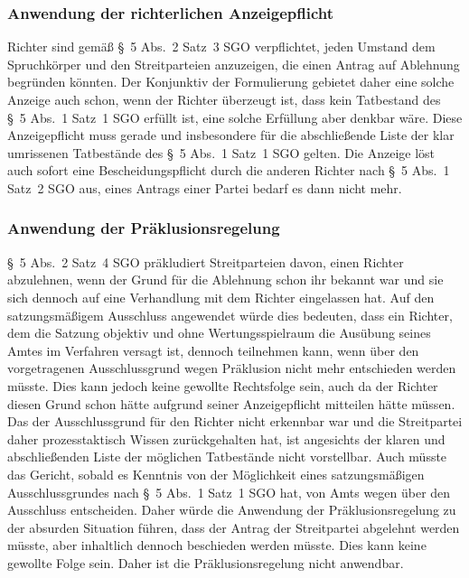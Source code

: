 \subsubsection{Anwendung der richterlichen Anzeigepflicht}
\label{Zusammensetzung:Spruchkoerper:Befangenheitsvermutung:Anzeigepflicht}
Richter sind gemäß \S~5 Abs.~2 Satz~3 SGO verpflichtet, jeden Umstand dem Spruchkörper und den Streitparteien anzuzeigen, die einen Antrag auf Ablehnung begründen könnten.
Der Konjunktiv der Formulierung gebietet daher eine solche Anzeige auch schon, wenn der Richter überzeugt ist, dass kein Tatbestand des \S~5 Abs.~1 Satz~1 SGO erfüllt ist, eine solche Erfüllung aber denkbar wäre.
Diese Anzeigepflicht muss gerade und insbesondere für die abschließende Liste der klar umrissenen Tatbestände des \S~5 Abs.~1 Satz~1 SGO gelten.
Die Anzeige löst auch sofort eine Bescheidungspflicht durch die anderen Richter nach \S~5 Abs.~1 Satz~2 SGO aus, eines Antrags einer Partei bedarf es dann nicht mehr.

\subsubsection{Anwendung der Präklusionsregelung}
\label{Zusammensetzung:Spruchkoerper:Befangenheitsvermutung:Praeklusion}
\S~5 Abs.~2 Satz~4 SGO präkludiert Streitparteien davon, einen Richter abzulehnen, wenn der Grund für die Ablehnung schon ihr bekannt war und sie sich dennoch auf eine Verhandlung mit dem Richter eingelassen hat.
Auf den satzungsmäßigem Ausschluss angewendet würde dies bedeuten, dass ein Richter, dem die Satzung objektiv und ohne Wertungsspielraum die Ausübung seines Amtes im Verfahren versagt ist, dennoch teilnehmen kann, wenn über den vorgetragenen Ausschlussgrund wegen Präklusion nicht mehr entschieden werden müsste.
Dies kann jedoch keine gewollte Rechtsfolge sein, auch da der Richter diesen Grund schon hätte aufgrund seiner Anzeigepflicht mitteilen hätte müssen.
Das der Ausschlussgrund für den Richter nicht erkennbar war und die Streitpartei daher prozesstaktisch Wissen zurückgehalten hat, ist angesichts der klaren und abschließenden Liste der möglichen Tatbestände nicht vorstellbar.
Auch müsste das Gericht, sobald es Kenntnis von der Möglichkeit eines satzungsmäßigen Ausschlussgrundes nach \S~5 Abs.~1 Satz~1 SGO hat, von Amts wegen über den Ausschluss entscheiden.
Daher würde die Anwendung der Präklusionsregelung zu der absurden Situation führen, dass der Antrag der Streitpartei abgelehnt werden müsste, aber inhaltlich dennoch beschieden werden müsste.
Dies kann keine gewollte Folge sein.
Daher ist die Präklusionsregelung nicht anwendbar.

